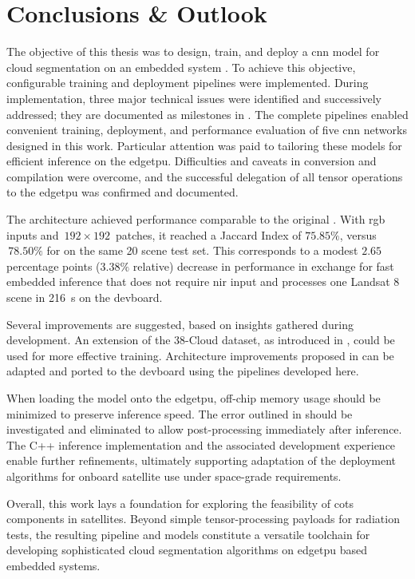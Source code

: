 {

\setlength{\parindent}{0pt}
\setlength{\parskip}{1em}

\chapter{Conclusions \& Outlook}

The objective of this thesis was to design, train, and deploy a \gls{cnn} model for cloud segmentation on an embedded system .
To achieve this objective, configurable training and deployment pipelines were implemented.
During implementation, three major technical issues were identified and successively addressed; they are documented as milestones in .
The complete pipelines enabled convenient training, deployment, and performance evaluation of five \gls{cnn} networks designed in this work.
Particular attention was paid to tailoring these models for efficient inference on the \gls{edgetpu}.
Difficulties and caveats in conversion and compilation were overcome, and the successful delegation of all tensor operations to the \gls{edgetpu} was confirmed and documented.

The  architecture achieved performance comparable to the original  \cite{CloudNet2019}.
With \gls{rgb} inputs and \(\,192\times192\,\) patches, it reached a Jaccard Index of \(75.85\%\), versus \(\,78.50\%\) for  on the same 20 scene test set.
This corresponds to a modest \(2.65\) percentage points (\(3.38\%\) relative) decrease in performance in exchange for fast embedded inference that does not require \gls{nir} input
and processes one Landsat 8 scene in 216~s on the \gls{devboard}.

Several improvements are suggested, based on insights gathered during development.
An extension of the 38-Cloud dataset, as introduced in \cite{CloudNetNew}, could be used for more effective training.
Architecture improvements proposed in \cite{CloudNetNew} can be adapted and ported to the \gls{devboard} using the pipelines developed here.

When loading the model onto the \gls{edgetpu}, off-chip memory usage should be minimized to preserve inference speed.
The error outlined in  should be investigated and eliminated to allow post-processing immediately after inference.
The C++ inference implementation and the associated development experience enable further refinements,
ultimately supporting adaptation of the deployment algorithms for onboard satellite use under space-grade requirements.

Overall, this work lays a foundation for exploring the feasibility of \gls{cots} components in satellites.
Beyond simple tensor-processing payloads for radiation tests, the resulting pipeline and models constitute a
versatile toolchain for developing sophisticated cloud segmentation algorithms on \gls{edgetpu} based embedded systems.

}